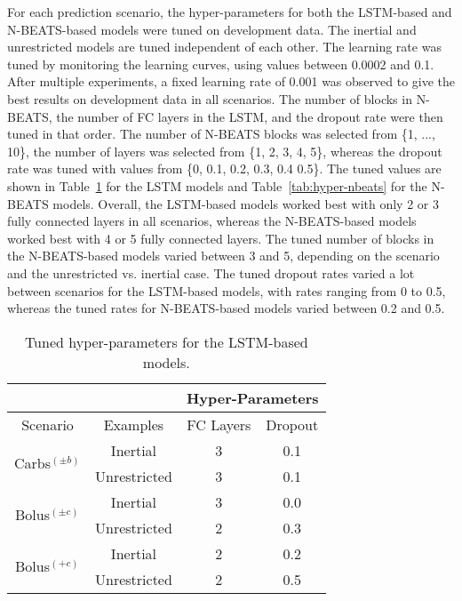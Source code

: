 For each prediction scenario, the hyper-parameters for both the \ac{LSTM}-based and \ac{N-BEATS}-based models were tuned on development data. The inertial and unrestricted models are tuned independent of each other. The learning rate was tuned by monitoring the learning curves, using values between 0.0002 \cite{rubin_falcone:nbeats_bgl} and 0.1. After multiple experiments, a fixed learning rate of 0.001 was observed to give the best results on development data in all scenarios. The number of blocks in \ac{N-BEATS}, the number of \ac{FC} layers in the \ac{LSTM}, and the dropout rate were then tuned in that order. The number of \ac{N-BEATS} blocks was selected from \{1, ..., 10\}, the number of layers was selected from \{1, 2, 3, 4, 5\}, whereas the dropout rate was tuned with values from \{0, 0.1, 0.2, 0.3, 0.4 0.5\}. The tuned values are shown in Table~\ref{tab:hyper-lstm} for the \ac{LSTM} models and Table~\ref{tab:hyper-nbeats} for the \ac{N-BEATS} models. Overall, the \ac{LSTM}-based models worked best with only 2 or 3 fully connected layers in all scenarios, whereas the \ac{N-BEATS}-based models worked best with 4 or 5 fully connected layers. The tuned number of blocks in the \ac{N-BEATS}-based models varied between 3 and 5, depending on the scenario and the unrestricted vs. inertial case. The tuned dropout rates varied a lot between scenarios for the \ac{LSTM}-based models, with rates ranging from 0 to 0.5, whereas the tuned rates for \ac{N-BEATS}-based models varied between 0.2 and 0.5.

\begin{table}[ht]
\caption{Tuned hyper-parameters for the LSTM-based models.}
\label{tab:hyper-lstm}
\begin{center}
\small
\begin{tabular}{|c|c|c|c|}
\cline{3-4}
\multicolumn{2}{l}{} & \multicolumn{2}{|c|}{Hyper-Parameters}\\
\hline
Scenario & Examples & FC Layers & Dropout\\
\hline
\multirow{2}{*}{Carbs$^{(\pm b)}$} & Inertial & 3 & 0.1\\
& Unrestricted & 3 & 0.1\\
\hline
\multirow{2}{*}{Bolus$^{(\pm c)}$} & Inertial & 3 & 0.0\\
& Unrestricted & 2 & 0.3\\
\hline
\multirow{2}{*}{Bolus$^{(+c)}$} & Inertial & 2 & 0.2\\
& Unrestricted & 2 & 0.5\\
\hline
\end{tabular}
\end{center}
\end{table}

